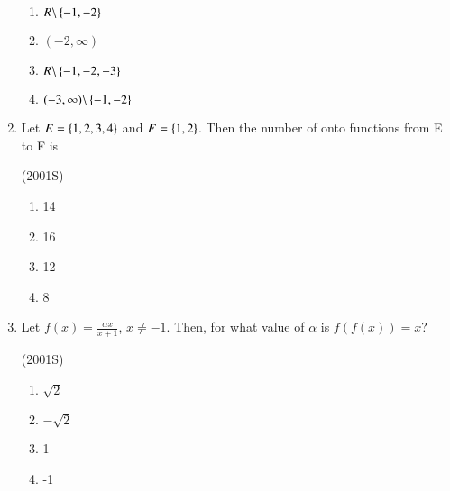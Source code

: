 \documentclass[journal,12pt,twocolumn]{IEEEtran}
\theoremstyle{remark}
\begin{document}
\begin{enumerate}
\begin{multicols}{2}
	\begin{enumerate}
		\item $R \backslash \left\{-1,-2\right\}$ 
		\item $(-2,\infty)$
		\item $R \backslash \left\{-1,-2,-3\right\}$ 
		\item $(-3,\infty)\backslash\left\{-1,-2\right\}$
	\end{enumerate}
\end{multicols}
                                                                                        
\item Let $E=\left\{1,2,3,4\right\}$ and $F=\left\{1,2\right\}$. Then the number of onto functions from E to F is

\hfill{(2001S)}

\begin{multicols}{4}
	\begin{enumerate}
		\item 14 
		\item 16 
		\item 12 
		\item 8
	\end{enumerate}
\end{multicols}

\item Let $f(x)=\frac{\alpha x}{x+1}$, $x\neq-1$. Then, for what value of $\alpha$ is $f(f(x))=x$?

\hfill{(2001S)}

\begin{multicols}{4}
	\begin{enumerate}
		\item $\sqrt{2}$ 
		\item $-\sqrt{2}$ 
		\item 1 
		\item -1
	\end{enumerate}
\end{multicols}

\end{enumerate}
\end{document}
